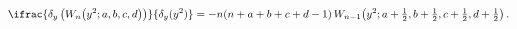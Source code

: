 \[\ifrac{\delta_{y}\left(\mathop{W_{n}\/}\nolimits\!\left(y^{2};a,b,c,d\right)%
\right)}{\delta_{y}(y^{2})}=-n(n+a+b+c+d-1)\*\mathop{W_{n-1}\/}\nolimits\!%
\left(y^{2};a+\tfrac{1}{2},b+\tfrac{1}{2},c+\tfrac{1}{2},d+\tfrac{1}{2}\right).\]